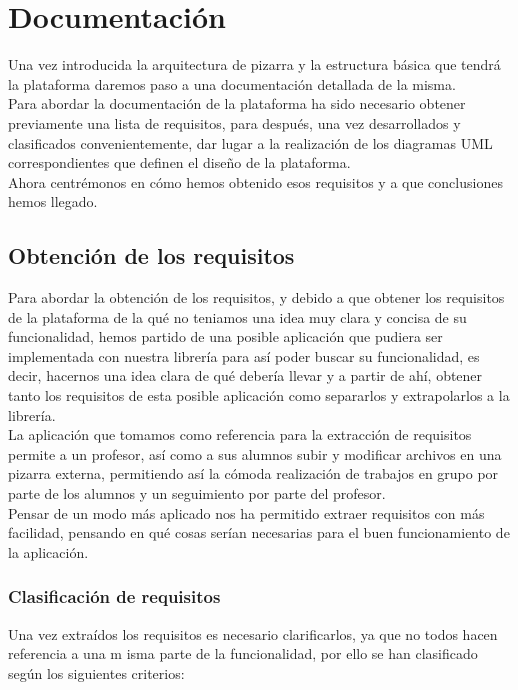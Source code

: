 \chapter{Documentación}
\lettrine[lines=1,slope=4pt,findent=0pt]{U}{}na vez introducida la arquitectura de pizarra y la estructura básica que tendrá la plataforma daremos paso a una documentación detallada de la misma.\\

Para abordar la documentación de la plataforma ha sido necesario obtener previamente una lista de requisitos, para después, una vez desarrollados y clasificados convenientemente, dar lugar a la realización de los diagramas UML correspondientes que definen el diseño de la plataforma.\\

Ahora centrémonos en cómo hemos obtenido esos requisitos y a que conclusiones hemos llegado.

\section{Obtención de los requisitos}
Para abordar la obtención de los requisitos, y debido a que obtener los requisitos de la plataforma de la qué no teniamos una idea muy clara y concisa de su funcionalidad, hemos partido de una posible aplicación que pudiera ser implementada con nuestra librería para así poder buscar su funcionalidad, es decir, hacernos una idea clara de qué debería llevar y a partir de ahí, obtener tanto los requisitos de esta posible aplicación como separarlos y extrapolarlos a la librería.\\

La aplicación que tomamos como referencia para la extracción de requisitos permite a un profesor, así como a sus alumnos subir y modificar archivos en una pizarra externa, permitiendo así la cómoda realización de trabajos en grupo por parte de los alumnos y un seguimiento por parte del profesor.\\

Pensar de un modo más aplicado nos ha permitido extraer requisitos con más facilidad, pensando en qué cosas serían necesarias para el buen funcionamiento de la aplicación.\\

\subsection{Clasificación de requisitos}
Una vez extraídos los requisitos es necesario clarificarlos, ya que no todos hacen referencia a una m isma parte de la funcionalidad, por ello se han clasificado según los siguientes criterios:

